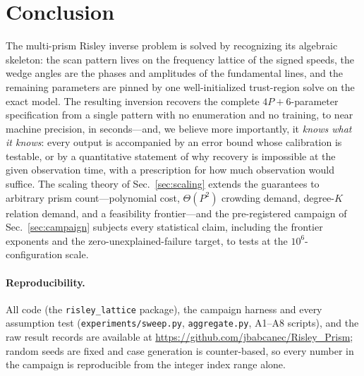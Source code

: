 \documentclass[twocolumn,preprintnumbers,amsmath,amssymb,pra,floatfix]{revtex4-2}
\begin{document}
\section{Conclusion}
\label{sec:conclusion}

The multi-prism Risley inverse problem is solved by recognizing its
algebraic skeleton: the scan pattern lives on the frequency lattice of
the signed speeds, the wedge angles are the phases and amplitudes of
the fundamental lines, and the remaining parameters are pinned by one
well-initialized trust-region solve on the exact model.  The resulting
inversion recovers the complete $4P+6$-parameter specification from a
single pattern with no enumeration and no training, to near machine
precision, in seconds---and, we believe more importantly, it
\emph{knows what it knows}: every output is accompanied by an error
bound whose calibration is testable, or by a quantitative statement
of why recovery is impossible at the given observation time, with a
prescription for how much observation would suffice.  The scaling
theory of Sec.~\ref{sec:scaling} extends the guarantees to arbitrary
prism count---polynomial cost, $\Theta(P^{2})$ crowding demand,
degree-$K$ relation demand, and a feasibility frontier---and the
pre-registered campaign of Sec.~\ref{sec:campaign} subjects every
statistical claim, including the frontier exponents and the
zero-unexplained-failure target, to tests at the $10^{6}$-configuration
scale.

\paragraph{Reproducibility.}
All code (the \texttt{risley\_lattice} package), the campaign harness
and every assumption test (\texttt{experiments/sweep.py},
\texttt{aggregate.py}, A1--A8 scripts), and the raw result records
are available at \url{https://github.com/jbabcanec/Risley_Prism};
random seeds are fixed and case generation is counter-based, so every
number in the campaign is reproducible from the integer index range
alone.
\end{document}
